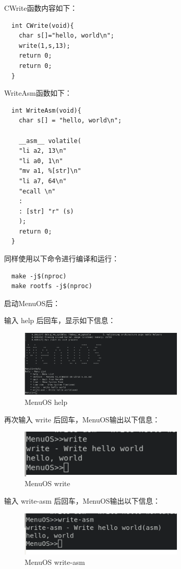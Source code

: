 \documentclass[lang=cn,10pt]{elegantbook}
\begin{document}
CWrite函数内容如下：

\begin{lstlisting}
  int CWrite(void){
    char s[]="hello, world\n";
    write(1,s,13);
    return 0;
    return 0;
  }
\end{lstlisting}

WriteAsm函数如下：


\begin{lstlisting}
  int WriteAsm(void){
    char s[] = "hello, world\n";

    __asm__ volatile(
    "li a2, 13\n"
    "li a0, 1\n"
    "mv a1, %[str]\n"
    "li a7, 64\n"
    "ecall \n"
    :
    : [str] "r" (s)
    );
    return 0;
  }
\end{lstlisting}

同样使用以下命令进行编译和运行：

\begin{lstlisting}
  make -j$(nproc)
  make rootfs -j$(nproc)
\end{lstlisting}

启动MenuOS后：

输入 help 后回车，显示如下信息：
\begin{figure}[htbp]
  \centering
  \includegraphics[width=0.7\textwidth]{image/image-20231105212850985.png}
  \caption{MenuOS help}
\end{figure}

再次输入 write 后回车，MenuOS输出以下信息：
\begin{figure}[htbp]
  \centering
  \includegraphics[width=0.7\textwidth]{image/image-20231105212959159.png}
  \caption{MenuOS write}
\end{figure}

输入 write-asm 后回车，MenuOS输出以下信息：
\begin{figure}[htbp]
  \centering
  \includegraphics[width=0.7\textwidth]{image/image-20231105213246034.png}
  \caption{MenuOS write-asm}
\end{figure}
\end{document}
